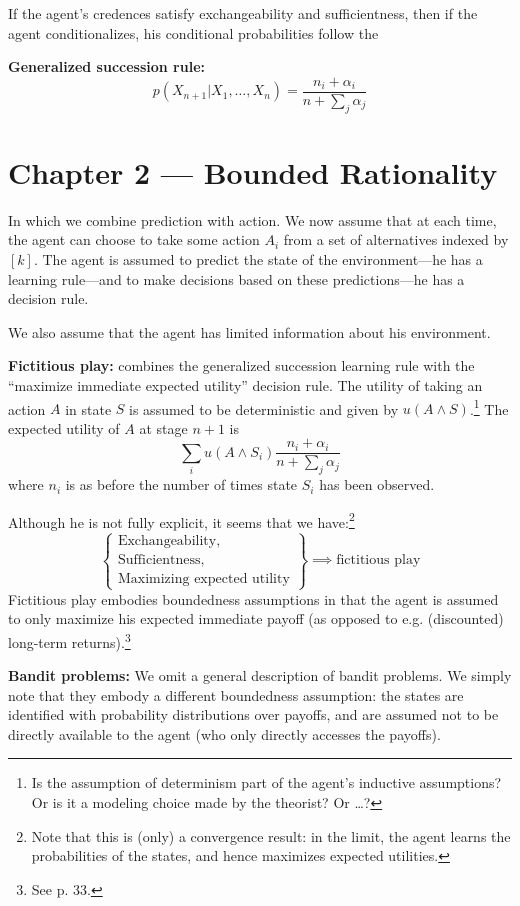 \documentclass{my-tufte}
\begin{document}
If the agent's credences satisfy exchangeability and sufficientness, then if the agent conditionalizes, his conditional probabilities follow the

\textbf{Generalized succession rule:}
\[
	p(X_{n + 1} | X_1, \dots, X_n) = \frac{n_i + \alpha_i}{n + \sum_j \alpha_j}
\]

\section{Chapter 2 --- Bounded Rationality}
In which we combine prediction with action. We now assume that at each time, the agent can choose to take some action $A_i$ from a set of alternatives indexed by $[k]$. The agent is assumed to predict the state of the environment---he has a learning rule---and to make decisions based on these predictions---he has a decision rule.

We also assume that the agent has limited information about his environment.

\textbf{Fictitious play:} combines the generalized succession learning rule with the ``maximize immediate expected utility'' decision rule. The utility of taking an action $A$ in state $S$ is assumed to be deterministic and given by $u(A \land S)$.\footnote{Is the assumption of determinism part of the agent's inductive assumptions? Or is it a modeling choice made by the theorist? Or \dots?} The expected utility of $A$ at stage $n+1$ is
\[
\sum_i u(A \land S_i) \frac{n_i + \alpha_i}{n + \sum_j \alpha_j}
\]
where $n_i$ is as before the number of times state $S_i$ has been observed.

Although he is not fully explicit, it seems that we have:\footnote{Note that this is (only) a convergence result: in the limit, the agent learns the probabilities of the states, and hence maximizes expected utilities.}
\[
\left \{ \begin{array}{l}
		\text{Exchangeability,}\\
		\text{Sufficientness,}\\
		\text{Maximizing expected utility}
	\end{array} \right \}
	\implies
	\text{fictitious play}
\]
Fictitious play embodies boundedness assumptions in that the agent is assumed to only maximize his expected immediate payoff (as opposed to e.g. (discounted) long-term returns).\footnote{See p. 33.}

\textbf{Bandit problems:} We omit a general description of bandit problems. We simply note that they embody a different boundedness assumption: the states are identified with probability distributions over payoffs, and are assumed not to be directly available to the agent (who only directly accesses the payoffs).
\end{document}
